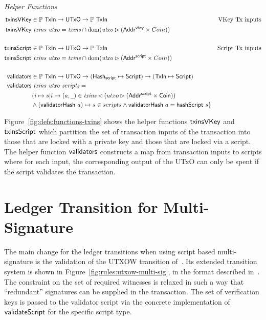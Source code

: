 \documentclass[11pt,a4paper,dvipsnames]{article}
\newcommand{\AddrVKey}{\type{Addr^{vkey}}}
\newcommand{\UTxO}{\type{UTxO}}
\newcommand{\Coin}{\type{Coin}}
\newcommand{\AddrScr}{\type{Addr^{script}}}
\newcommand{\HashScr}{\type{Hash_{script}}}
\newcommand{\Script}{\type{Script}}
\newcommand{\TxIn}{\type{TxIn}}
\newcommand{\wcard}[0]{\underline{\phantom{a}}}
\theoremstyle{definition}
\begin{document}
\begin{figure*}[htb]
  \emph{Helper Functions}
  \begin{align*}
    \fun{txinsVKey} & \in \powerset \TxIn \to \UTxO \to \powerset\TxIn & \text{VKey Tx inputs}\\
    \fun{txinsVKey} & ~\var{txins}~\var{utxo} =
    \var{txins} \cap \dom (\var{utxo} \restrictrange (\AddrVKey \times Coin))
    \\
    \\
    \fun{txinsScript} & \in \powerset \TxIn \to \UTxO \to \powerset\TxIn & \text{Script Tx inputs}\\
    \fun{txinsScript} & ~\var{txins}~\var{utxo} =
                        \var{txins} \cap \dom (\var{utxo} \restrictrange (\AddrScr \times Coin))
    \\
    \\
    \fun{validators} & \in \powerset\TxIn \to \UTxO \to (\HashScr\mapsto\Script) \to
                       (\TxIn \mapsto \Script) \\
    \fun{validators} &~\var{txins}~\var{utxo}~\var{scripts} = \\
                       & \{
                         i\mapsto s \vert
                         i\mapsto (a,\wcard) \in \var{txins}\restrictdom(utxo
                         \restrictrange (\AddrScr\times\Coin)) \\
                    & \wedge (\fun{validatorHash}~a) \mapsto s \in scripts
                      \wedge \fun{validatorHash}~a = \fun{hashScript}~s\}
  \end{align*}
  \caption{Helper Functions for Transaction Inputs}
  \label{fig:defs:functions-txins}
\end{figure*}

Figure~\ref{fig:defs:functions-txins} shows the helper functions
$\mathsf{txinsVKey}$ and $\mathsf{txinsScript}$ which partition the set of transaction
inputs of the transaction into those that are locked with a private key and
those that are locked via a script. The helper function $\mathsf{validators}$
constructs a map from transaction inputs to scripts where for each input, the
corresponding output of the UTxO can only be spent if the script validates the
transaction.

\section{Ledger Transition for Multi-Signature}
\label{sec:ledg-trans-multi}

The main change for the ledger transitions when using script based
multi-signature is the validation of the UTXOW transition
of~\cite{shelley_formal_spec}. Its extended transition system is shown in
Figure~\ref{fig:rules:utxow-multi-sig}, in the format described
in~\cite{small_step_semantics}. The constraint on the set of required witnesses
is relaxed in such a way that ``redundant'' signatures can be supplied in the
transaction. The set of verification keys is passed to the validator script via
the concrete implementation of $\mathsf{validateScript}$ for the specific script
type.
\end{document}
